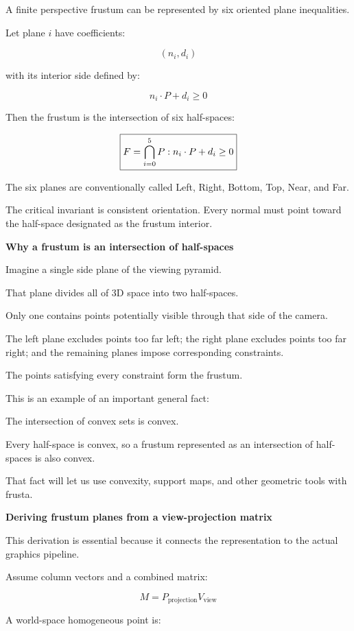 A finite perspective frustum can be represented by six oriented plane inequalities.

Let plane \(i\) have coefficients:

\[
(n_i,d_i)
\]

with its interior side defined by:

\[
n_i\cdot P+d_i\ge0
\]

Then the frustum is the intersection of six half-spaces:

\[
\boxed{ F=\bigcap_{i=0}^{5} \\{P:n_i\cdot P+d_i\ge0\\} }
\]

The six planes are conventionally called Left, Right, Bottom, Top, Near, and Far.

The critical invariant is consistent orientation. Every normal must point toward the half-space designated as the frustum interior.

\textbf{Why a frustum is an intersection of half-spaces}

Imagine a single side plane of the viewing pyramid.

That plane divides all of 3D space into two half-spaces.

Only one contains points potentially visible through that side of the camera.

The left plane excludes points too far left; the right plane excludes points too far right; and the remaining planes impose corresponding constraints.

The points satisfying every constraint form the frustum.

This is an example of an important general fact:

The intersection of convex sets is convex.

Every half-space is convex, so a frustum represented as an intersection of half-spaces is also convex.

That fact will let us use convexity, support maps, and other geometric tools with frusta.

\textbf{Deriving frustum planes from a view-projection matrix}

This derivation is essential because it connects the representation to the actual graphics pipeline.

Assume column vectors and a combined matrix:

\[
M=P_{\mathrm{projection}}V_{\mathrm{view}}
\]

A world-space homogeneous point is:

